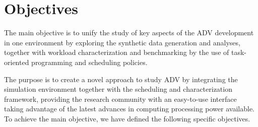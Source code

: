   
              

\section{Objectives} \label{objetivos}





The main objective is to unify the study of key aspects of the ADV development in one environment by exploring the synthetic data generation and analyses, together with workload characterization and benchmarking by the use of task-oriented programming and scheduling policies. 

The purpose is to create a novel approach to study ADV by integrating the simulation environment together with the scheduling and characterization framework, providing the research community with an easy-to-use interface taking advantage of the latest advances in computing processing power available. To achieve the main objective, we have defined the following specific objectives.

